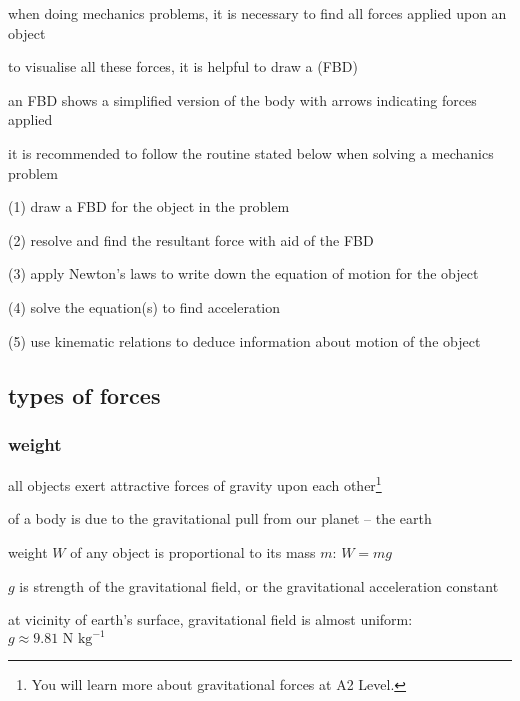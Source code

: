 when doing mechanics problems, it is necessary to find all forces applied upon an object

to visualise all these forces, it is helpful to draw a  (FBD)

an FBD shows a simplified version of the body with arrows indicating forces applied

\newpage

it is recommended to follow the routine stated below when solving a mechanics problem

\begin{compactitem}
	\item[(1)] draw a FBD for the object in the problem
	
	\item[(2)] resolve and find the resultant force with aid of the FBD
	
	\item[(3)] apply Newton's laws to write down the equation of motion for the object
	
	\item[(4)] solve the equation(s) to find acceleration
	
	\item[(5)] use kinematic relations to deduce information about motion of the object
\end{compactitem}



\subsection{types of forces}

\subsubsection{weight}\label{ch_weight}

all objects exert attractive forces of gravity upon each other\footnote{You will learn more about gravitational forces at A2 Level.}

 of a body is due to the gravitational pull from our planet -- the earth

weight $W$ of any object is proportional to its mass $m$: $\boxed{W=mg}$

$g$ is strength of the gravitational field, or the gravitational acceleration constant

\cmt at vicinity of earth's surface, gravitational field is almost uniform: $g \approx 9.81 \text{ N kg}^{-1}$

